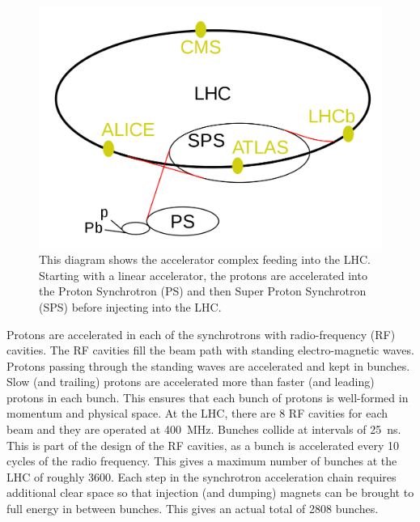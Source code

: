 \begin{figure}[!tp]
    \centering
    \includegraphics[width=\textwidth]{figures/1200px-LHC_svg.png}
    \caption[
       LHC accelerator complex.
    ]{
        This diagram shows the accelerator complex feeding into the LHC.  Starting with a linear accelerator, the protons are accelerated into the Proton Synchrotron (PS) and then Super Proton Synchrotron (SPS) before injecting into the LHC. 
    }
    \label{fig:lhc_diag}
\end{figure}

Protons are accelerated in each of the synchrotrons with radio-frequency (RF) cavities.  The RF cavities fill the beam path with standing electro-magnetic waves. Protons passing through the standing waves are accelerated and kept in bunches. Slow (and trailing) protons are accelerated more than faster (and leading) protons in each bunch. This ensures that each bunch of protons is well-formed in momentum and physical space. At the LHC, there are 8 RF cavities for each beam and they are operated at \SI{400}{MHz}. Bunches collide at intervals of \SI{25}{ns}.  This is part of the design of the RF cavities, as a bunch is accelerated every 10 cycles of the radio frequency. This gives a maximum number of bunches at the LHC of roughly 3600. Each step in the synchrotron acceleration chain requires additional clear space so that injection (and dumping) magnets can be brought to full energy in between bunches. This gives an actual total of 2808 bunches.

